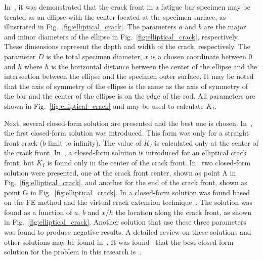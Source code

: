 \documentclass[preprint,12pt]{elsarticle}
\begin{document}
In~\cite{toribio2009automated}, it was demonstrated that the crack front in a fatigue bar specimen may be treated as an ellipse with the center located at the specimen surface, as illustrated in Fig.~\ref{fig:elliptical_crack}. The parameters $a$ and $b$ are the major and minor diameters of the ellipse in Fig.~\ref{fig:elliptical_crack}, respectively. These dimensions represent the depth and width of the crack, respectively. The parameter $D$ is the total specimen diameter, $x$ is a chosen coordinate between 0 and $h$ where $h$ is the horizontal distance between the center of the ellipse and the intersection between the ellipse and the specimen outer surface. It may be noted that the axis of symmetry of the ellipse is the same as the axis of symmetry of the bar and the center of the ellipse is on the edge of the rod. All parameters are shown in Fig.~\ref{fig:elliptical_crack} and may be used to calculate $K_I$.

Next, several closed-form solution are presented and the best one is chosen. In~\cite{valiente1980criterios}, the first closed-form solution was introduced. This form was only for a straight front crack ($b$ limit to infinity). The value of $K_I$ is calculated only at the center of the crack front.
In~\cite{astiz1986incompatible}, a closed-form solution is introduced for an elliptical crack front; but $K_I$ is found only in the center of the crack front. In~\cite{couroneau1998simplified,carpinteri1992elliptical} two closed-form solution were presented, one at the crack front center, shown as point A in Fig.~\ref{fig:elliptical_crack}, and another for the end of the crack front, shown as point G in Fig.~\ref{fig:elliptical_crack}. In \cite{shin2004experimental} a closed-form solution was found based on the FE method and the virtual crack extension technique~\cite{hellen1975method}. The solution was found as a function of $a$, $b$ and $x/h$ the location along the crack front, as shown in Fig.~\ref{fig:elliptical_crack}.
Another solution that use these three parameters~\cite{shih2002stress} was found to produce negative results. A detailed review on these solutions and other solutions may be found in~\cite{toribio2009automated}.
It was found~\cite{toribio2009automated} that the best closed-form solution for the problem in this research is~\cite{shih2002stress}.
\end{document}
